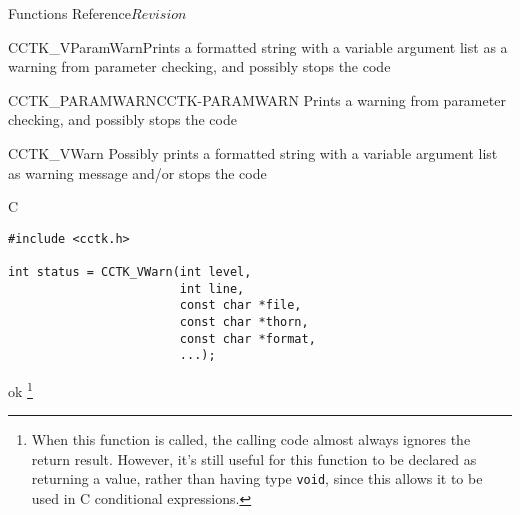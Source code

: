 \begin{cactuspart}{ Functions Reference}{}{$Revision$}
\begin{FunctionDescription}{CCTK\_VParamWarn}{Prints a formatted string with a variable argument list as a warning from parameter checking, and possibly stops the code}
\begin{SeeAlsoSection}
\begin{SeeAlso2}{CCTK\_PARAMWARN}{CCTK-PARAMWARN}
Prints a warning from parameter checking, and possibly stops the code
\end{SeeAlso2}
\end{SeeAlsoSection}
\end{FunctionDescription}

\begin{FunctionDescription}{CCTK\_VWarn}
\label{CCTK-VWarn}
Possibly prints a formatted string with a variable argument list as
warning message and/or stops the code

\begin{SynopsisSection}
\begin{Synopsis}{C}
\begin{verbatim}
#include <cctk.h>

int status = CCTK_VWarn(int level,
                        int line,
                        const char *file,
                        const char *thorn,
                        const char *format,
                        ...);
\end{verbatim}
\end{Synopsis}
\end{SynopsisSection}

\begin{ResultSection}
\begin{Result}{0}
ok%
\footnote{%
         When this function is called, the calling code almost
         always ignores the return result.  However, it's still
         useful for this function to be declared as returning a
         value, rather than having type \texttt{void}, since this
         allows it to be used in C conditional expressions.
         }%
\end{Result}
\end{ResultSection}


\end{FunctionDescription}
\end{cactuspart}
